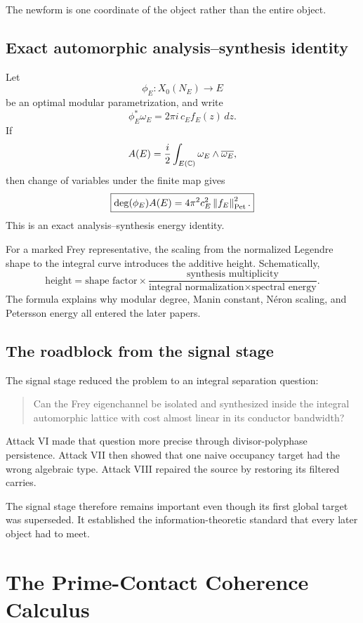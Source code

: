 The newform is one coordinate of the object rather than the entire object.

\section{Exact automorphic analysis--synthesis identity}
Let
\[
\phi_E:X_0(N_E)\longrightarrow E
\]
be an optimal modular parametrization, and write
\[
\phi_E^*\omega_E
=
2\pi i\,c_Ef_E(z)\,dz.
\]
If
\[
A(E)
=
\frac{i}{2}
\int_{E(\mathbb C)}\omega_E\wedge\overline{\omega_E},
\]
then change of variables under the finite map gives
\[
\boxed{
\deg(\phi_E)A(E)
=
4\pi^2c_E^2\left\lVert f_E\right\rVert_{\mathrm{Pet}}^2.
}
\]
This is an exact analysis--synthesis energy identity.

For a marked Frey representative, the scaling from the normalized Legendre shape to the integral curve introduces the additive height. Schematically,
\[
\boxed{
\text{height}
=
\text{shape factor}
\times
\frac{\text{synthesis multiplicity}}
{\text{integral normalization}\times\text{spectral energy}}.
}
\]
The formula explains why modular degree, Manin constant, N\'eron scaling, and Petersson energy all entered the later papers.

\section{The roadblock from the signal stage}
The signal stage reduced the problem to an integral separation question:

\begin{quote}
Can the Frey eigenchannel be isolated and synthesized inside the integral automorphic lattice with cost almost linear in its conductor bandwidth?
\end{quote}

Attack VI made that question more precise through divisor-polyphase persistence. Attack VII then showed that one naive occupancy target had the wrong algebraic type. Attack VIII repaired the source by restoring its filtered carries.

The signal stage therefore remains important even though its first global target was superseded. It established the information-theoretic standard that every later object had to meet.

\chapter{The Prime-Contact Coherence Calculus}

